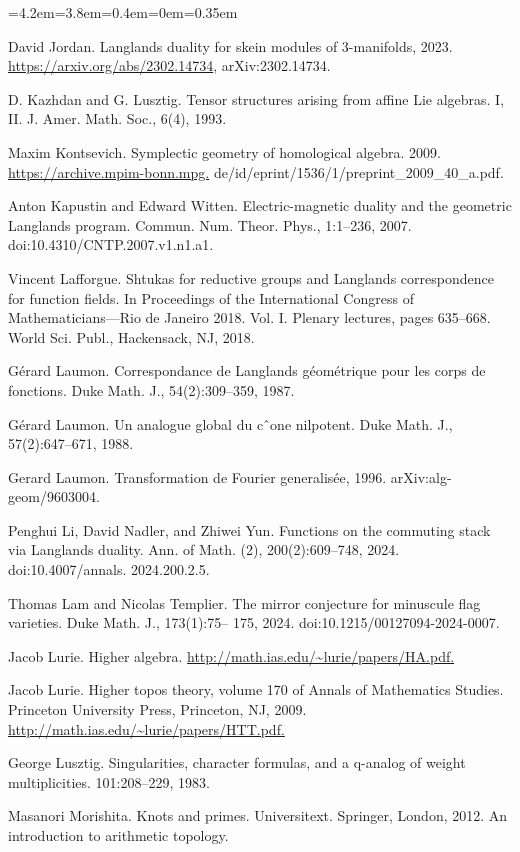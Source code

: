 \begin{list}{}{\leftmargin=4.2em=3.8em=0.4em\itemindent=0em\parsep=0.35em}
\item[{Jor23}] David Jordan. Langlands duality for skein modules of 3-manifolds, 2023. \url{https://arxiv.org/abs/2302.14734}, arXiv:2302.14734.
\item[{KL93}] D. Kazhdan and G. Lusztig. Tensor structures arising from affine Lie algebras. I, II. J. Amer. Math. Soc., 6(4), 1993.
\item[{Kon09}] Maxim Kontsevich. Symplectic geometry of homological algebra. 2009. \url{https://archive.mpim-bonn.mpg.} de/id/eprint/1536/1/preprint\_2009\_40\_a.pdf.
\item[{KW07}] Anton Kapustin and Edward Witten. Electric-magnetic duality and the geometric Langlands program. Commun. Num. Theor. Phys., 1:1–236, 2007. doi:10.4310/CNTP.2007.v1.n1.a1.
\item[{Laf18}] Vincent Lafforgue. Shtukas for reductive groups and Langlands correspondence for function fields. In Proceedings of the International Congress of Mathematicians—Rio de Janeiro 2018. Vol. I. Plenary lectures, pages 635–668. World Sci. Publ., Hackensack, NJ, 2018.
\item[{Lau87}] Gérard Laumon. Correspondance de Langlands géométrique pour les corps de fonctions. Duke Math. J., 54(2):309–359, 1987.
\item[{Lau88}] Gérard Laumon. Un analogue global du cˆone nilpotent. Duke Math. J., 57(2):647–671, 1988.
\item[{Lau96}] Gerard Laumon. Transformation de Fourier generalisée, 1996. arXiv:alg-geom/9603004.
\item[{LNY24}] Penghui Li, David Nadler, and Zhiwei Yun. Functions on the commuting stack via Langlands duality. Ann. of Math. (2), 200(2):609–748, 2024. doi:10.4007/annals. 2024.200.2.5.
\item[{LT24}] Thomas Lam and Nicolas Templier. The mirror conjecture for minuscule flag varieties. Duke Math. J., 173(1):75– 175, 2024. doi:10.1215/00127094-2024-0007.
\item[{Lur}] Jacob Lurie. Higher algebra. \url{http://math.ias.edu/~lurie/papers/HA.pdf.}
\item[{Lur09}] Jacob Lurie. Higher topos theory, volume 170 of Annals of Mathematics Studies. Princeton University Press, Princeton, NJ, 2009. \url{http://math.ias.edu/~lurie/papers/HTT.pdf.}
\item[{Lus83}] George Lusztig. Singularities, character formulas, and a q-analog of weight multiplicities. 101:208–229, 1983.
\item[{Mor12}] Masanori Morishita. Knots and primes. Universitext. Springer, London, 2012. An introduction to arithmetic topology.

\end{list}
